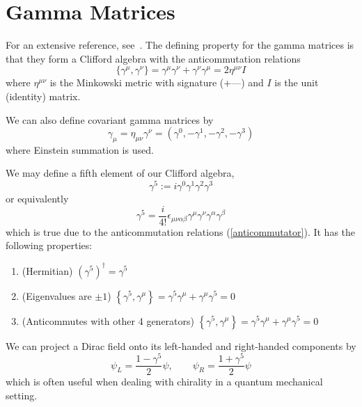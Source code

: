 \section{Gamma Matrices}

For an extensive reference, see~\cite{Borodulin:1995xd}. The defining property for the gamma matrices is that they form a Clifford algebra with the anticommutation relations
\begin{equation}\label{anticommutator}
\{\gamma^{\mu},\gamma^{\nu}\} = \gamma^{\mu}\gamma^{\nu} + \gamma^{\nu}\gamma^{\mu} = 2\eta^{\mu\nu}I
\end{equation}
where $\eta^{\mu\nu}$ is the Minkowski metric with signature (+---) and $I$ is the unit (identity) matrix.

We can also define covariant gamma matrices by
\begin{equation}
\gamma_\mu = \eta_{\mu \nu} \gamma^\nu = \left(\gamma^0, -\gamma^1, -\gamma^2, -\gamma^3 \right)
\end{equation}
where Einstein summation is used.

\begin{rmk}
We may define a fifth element of our Clifford algebra,
\begin{equation}
 \gamma^5 := i\gamma^0\gamma^1\gamma^2\gamma^3
\end{equation}
or equivalently
\begin{equation}
 \gamma^5 = \frac{i}{4!} \epsilon_{\mu \nu \alpha \beta} \gamma^{\mu} \gamma^{\nu} \gamma^{\alpha} \gamma^{\beta} 
\end{equation}
which is true due to the anticommutation relations (\ref{anticommutator}). It has the following properties:
\begin{enumerate}
\item{(Hermitian)} $(\gamma^5)^\dagger = \gamma^5 \,$
\item{(Eigenvalues are $\pm1$)} $\left\{ \gamma^5,\gamma^\mu \right\} =\gamma^5 \gamma^\mu + \gamma^\mu \gamma^5 = 0 \,$
\item{(Anticommutes with other 4 generators)} $\left\{ \gamma^5,\gamma^\mu \right\} =\gamma^5 \gamma^\mu + \gamma^\mu \gamma^5 = 0 \,$
\end{enumerate}
\end{rmk}

\begin{rmk}
We can project a Dirac field onto its left-handed and right-handed components by
\begin{equation}
\psi_L= \frac{1-\gamma^5}{2}\psi, \qquad\psi_R= \frac{1+\gamma^5}{2}\psi 
\end{equation}
which is often useful when dealing with chirality in a quantum mechanical setting.
\end{rmk}

